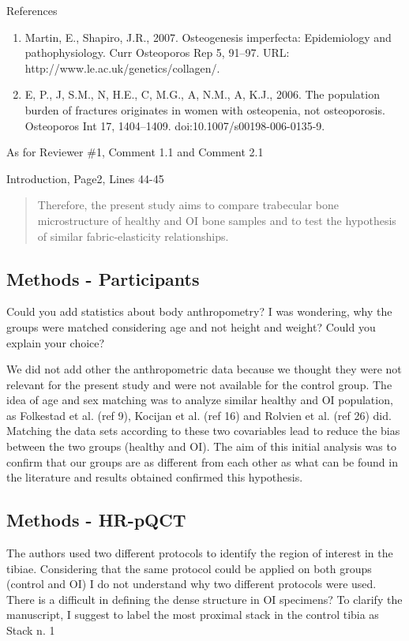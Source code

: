 \documentclass{AR2RC}
\begin{document}
References\vspace{-1em}
\begin{enumerate}
	\item Martin, E., Shapiro, J.R., 2007. Osteogenesis imperfecta: Epidemiology and pathophysiology. Curr Osteoporos Rep 5, 91–97. URL: http://www.le.ac.uk/genetics/collagen/.
	\item E, P., J, S.M., N, H.E., C, M.G., A, N.M., A, K.J., 2006. The population burden of fractures originates in women with osteopenia, not osteoporosis. Osteoporos Int 17, 1404–1409. doi:10.1007/s00198-006-0135-9.
\end{enumerate}

As for Reviewer \#1, Comment 1.1 and Comment 2.1\par

Introduction, Page2, Lines 44-45
\begin{quote}
	Therefore, the present study aims to compare trabecular bone microstructure of healthy and OI bone samples and to test the hypothesis of similar fabric-elasticity relationships.
\end{quote}


\subsection{Methods - Participants}
\RC Could you add statistics about body anthropometry? I was wondering, why the groups were matched considering age and not height and weight? Could you explain your choice?

\AR We did not add other the anthropometric data because we thought they were not relevant for the present study and were not available for the control group. The idea of age and sex matching was to analyze similar healthy and OI population, as Folkestad et al. (ref 9), Kocijan et al. (ref 16) and Rolvien et al. (ref 26) did. Matching the data sets according to these two covariables lead to reduce the bias between the two groups (healthy and OI). The aim of this initial analysis was to confirm that our groups are as different from each other as what can be found in the literature and results obtained confirmed this hypothesis.

\subsection{Methods - HR-pQCT}
\RC The authors used two different protocols to identify the region of interest in the tibiae. Considering that the same protocol could be applied on both groups (control and OI) I do not understand why two different protocols were used. There is a difficult in defining the dense structure in OI specimens? To clarify the manuscript, I suggest to label the most proximal stack in the control tibia as Stack n. 1
\end{document}
